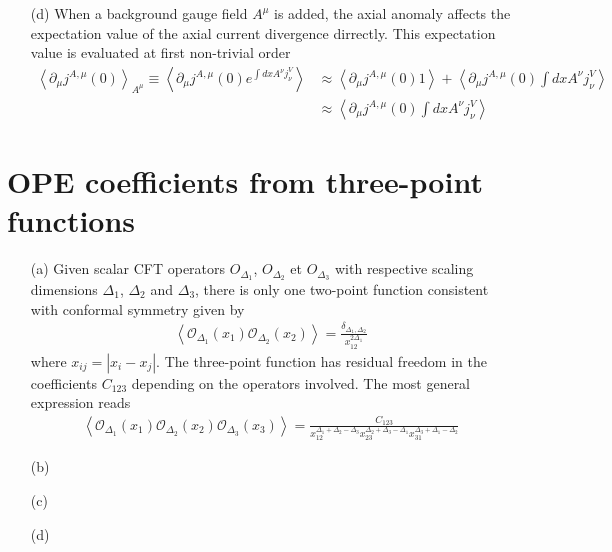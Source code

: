 \documentclass[10pt, a4paper]{article}
\begin{document}
{\begin{enumerate}
\begin{align*}
    &= -i  \langle \int \text{d}x_1 \  \partial^\mu j_{\mu}^{A}(x_1) j_{\nu}^{V}(x + x_1)\rangle = -i   \langle  \  \partial^\mu j_{\mu}^{A}(0) j_{\nu}^{V}(x)\rangle \int \text{d}x_1
  \end{align*}
  and 
  \begin{align*}
    - \frac{1}{2\pi}\int \text{d}p\ e^{i p \cdot x} a\epsilon_{\mu\nu} p^\mu = a\ i\ \epsilon_{\mu\nu} \partial^\mu \delta(x)
  \end{align*}
  which shows that the divergence of the axial current has a non-vanishing correlator (can't be explained by contact terms since they would vanish through $\delta j_\nu(x) = 0$) with the vector current contradicting the Ward identity for the axial current. 
  
  \item[(d)] When a background gauge field $A^{\mu}$ is added, the axial anomaly affects the expectation value of the axial current divergence dirrectly. This expectation value is evaluated at first non-trivial order 
  \begin{align*}
    \left\langle\partial_\mu j^{A, \mu}(0)\right\rangle_{A^\mu} \equiv\left\langle\partial_\mu j^{A, \mu}(0) e^{\int d x A^\nu j_\nu^V}\right\rangle &\approx \left\langle\partial_\mu j^{A, \mu}(0) 1\right\rangle  +   \left\langle\partial_\mu j^{A, \mu}(0) \int d x A^\nu j_\nu^V\right\rangle \\
    &\approx \left\langle\partial_\mu j^{A, \mu}(0) \int d x A^\nu j_\nu^V\right\rangle 
  \end{align*}
\end{enumerate}

\section{OPE coefficients from three-point functions}

\begin{enumerate}
  \item[(a)] Given scalar CFT operators $O_{\Delta_1}$, $O_{\Delta_2}$ et $O_{\Delta_3}$ with respective scaling dimensions $\Delta_1$, $\Delta_2$ and $\Delta_3$, there is only one two-point function consistent with conformal symmetry given by 
  \begin{align*}
    \left\langle\mathcal{O}_{\Delta_1}(x_1) \mathcal{O}_{\Delta_2}(x_2)\right\rangle=\frac{\delta_{\Delta_1, \Delta_2}}{x^{2 \Delta_1}_{12}}
  \end{align*}
  where $x_{ij} = |x_i - x_j|$. The three-point function has residual freedom in the coefficients $C_{123}$ depending on the operators involved. The most general expression reads 
  \begin{align*}
    \left\langle\mathcal{O}_{\Delta_1}\left(x_1\right) \mathcal{O}_{\Delta_2}\left(x_2\right) \mathcal{O}_{\Delta_3}\left(x_3\right)\right\rangle=\frac{C_{123}}{x_{12}^{\Delta_1+\Delta_2-\Delta_3} x_{23}^{\Delta_2+\Delta_3-\Delta_1} x_{31}^{\Delta_3+\Delta_1-\Delta_2}}
  \end{align*}
  \item[(b)] 
  \item[(c)]
  \item[(d)] 
\end{enumerate}


}
\end{document}
